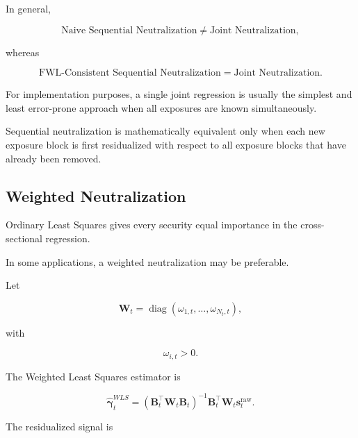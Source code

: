 \documentclass[11pt,a4paper]{article}
\begin{document}
In general,

\begin{equation}
\boxed{
\text{Naive Sequential Neutralization}
\neq
\text{Joint Neutralization},
}
\end{equation}

whereas

\begin{equation}
\boxed{
\text{FWL-Consistent Sequential Neutralization}
=
\text{Joint Neutralization}.
}
\end{equation}

For implementation purposes, a single joint regression is usually the simplest
and least error-prone approach when all exposures are known simultaneously.

Sequential neutralization is mathematically equivalent only when each new
exposure block is first residualized with respect to all exposure blocks that
have already been removed.

\subsection{Weighted Neutralization}
\label{subsec:weighted_neutralization}

Ordinary Least Squares gives every security equal importance in the
cross-sectional regression.

In some applications, a weighted neutralization may be preferable.

Let

\begin{equation}
\mathbf{W}_t
=
\operatorname{diag}
\left(
\omega_{1,t},
\ldots,
\omega_{N_t,t}
\right),
\end{equation}

with

\begin{equation}
\omega_{i,t}>0.
\end{equation}

The Weighted Least Squares estimator is

\begin{equation}
\boxed{
\widehat{\boldsymbol{\gamma}}_t^{WLS}
=
\left(
\mathbf{B}_t^\top
\mathbf{W}_t
\mathbf{B}_t
\right)^{-1}
\mathbf{B}_t^\top
\mathbf{W}_t
\mathbf{s}_t^{\mathrm{raw}}.
}
\end{equation}

The residualized signal is
\end{document}
